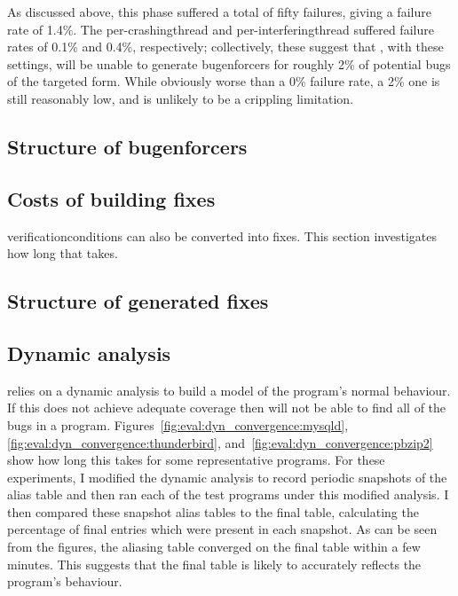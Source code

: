 As discussed above, this phase suffered a total of fifty failures,
giving a failure rate of 1.4\%.  The per-\gls{crashingthread} and
per-\gls{interferingthread} suffered failure rates of 0.1\% and 0.4\%,
respectively; collectively, these suggest that {\technique}, with
these settings, will be unable to generate \glspl{bugenforcer} for
roughly 2\% of potential bugs of the targeted form.  While obviously
worse than a 0\% failure rate, a 2\% one is still reasonably low, and
is unlikely to be a crippling limitation.




\subsection{Structure of \glspl{bugenforcer}}


\subsection{Costs of building fixes}

\Glspl{verificationcondition} can also be converted into fixes.  This
section investigates how long that takes.  

\subsection{Structure of generated fixes}


\subsection{Dynamic analysis}

{\Technique} relies on a dynamic analysis to build a model of the
program's normal behaviour.  If this does not achieve adequate
coverage then {\technique} will not be able to find all of the bugs in
a program.  Figures~\ref{fig:eval:dyn_convergence:mysqld},
\ref{fig:eval:dyn_convergence:thunderbird},
and~\ref{fig:eval:dyn_convergence:pbzip2} show how long this takes for
some representative programs.  For these experiments, I modified the
dynamic analysis to record periodic snapshots of the alias table and
then ran each of the test programs under this modified analysis.  I
then compared these snapshot alias tables to the final table,
calculating the percentage of final entries which were present in each
snapshot.  As can be seen from the figures, the aliasing table
converged on the final table within a few minutes.  This suggests that
the final table is likely to accurately reflects the program's
behaviour.

